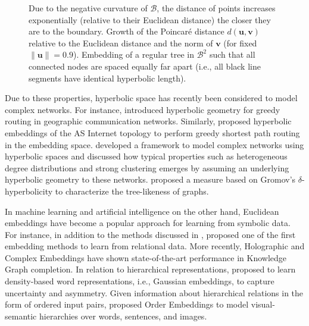 \documentclass[11pt]{article}
\renewcommand{\vec}[1]{\bm{#1}}
\newcommand{\vu}{\vec{u}}
\newcommand{\vv}{\vec{v}}
\newcommand{\manifold}[1]{\mathcal{#1}}
\begin{document}
\begin{figure}
\begin{minipage}[b]{.3\linewidth}
    \label{fig:poin-dist}
  \end{minipage}
  \caption{\small{} Due to the negative curvature of $\manifold{B}$, the distance of points increases exponentially (relative to their Euclidean distance) the closer they are to the boundary.  Growth of the Poincaré distance $d(\vu,\vv)$ relative to the Euclidean distance and the norm of $\vv$ (for fixed $\|\vu\| = 0.9$).  Embedding of a regular tree in $\manifold{B}^2$ such that all connected nodes are spaced equally far apart (i.e., all black line segments have identical hyperbolic length).}
\end{figure}

Due to these properties, hyperbolic space has recently been considered to model
complex networks. For instance, \citet{kleinberg2007geographic} introduced
hyperbolic geometry for greedy routing in geographic communication networks.
Similarly, \citet{boguna2010sustaining} proposed hyperbolic embeddings of the AS
Internet topology to perform greedy shortest path routing in the embedding
space. \citet{hyperbolic/krioukov2010hyperbolic} developed a framework to model
complex networks using hyperbolic spaces and discussed how typical properties
such as heterogeneous degree distributions and strong clustering emerges by
assuming an underlying hyperbolic geometry to these networks.
\citet{adcock2013tree} proposed a measure based on Gromov's \(\delta\)-hyperbolicity
\cite{gromov1987hyperbolic} to characterize the tree-likeness of graphs.

In machine learning and artificial intelligence on the other hand, Euclidean
embeddings have become a popular approach for learning from symbolic data. For
instance, in addition to the methods discussed in ,
\citet{paccanaro2001learning} proposed one of the first embedding methods to learn
from relational data. More recently, Holographic \cite{kgs/nickel2016holographic}
and Complex Embeddings \cite{DBLP:conf/icml/TrouillonWRGB16} have shown
state-of-the-art performance in Knowledge Graph completion. In relation to
hierarchical representations, \citet{vilnis2015word} proposed to learn density-based
word representations, i.e., Gaussian embeddings, to capture uncertainty
and asymmetry. Given information about hierarchical relations in the form of
ordered input pairs, \citet{vendrov2015order} proposed Order Embeddings to model
visual-semantic hierarchies over words, sentences, and images.
\end{document}
